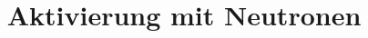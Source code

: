 

\subject{Versuch 702}
\title{Aktivierung mit Neutronen}


    \maketitle
    \thispagestyle{empty}
    \tableofcontents
    \newpage
    
    
    \newpage
    
    \newpage
    
    
    \printbibliography{}
    

